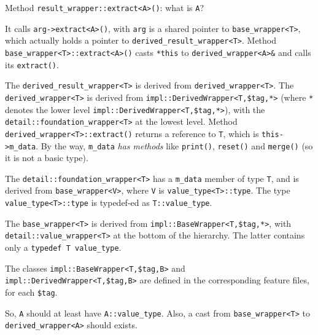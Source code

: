 \documentclass[12pt]{article}
\newcommand{\code}[1]{\texttt{#1}}
\begin{document}
Method \code{result\_wrapper::extract<A>()}: what is \code{A}?

It calls \code{arg->extract<A>()}, with \code{arg} is a shared pointer
to \code{base\_wrapper<T>}, which actually holds a pointer to
\code{derived\_result\_wrapper<T>}. Method
\code{base\_wrapper<T>::extract<A>()} casts \code{*this} to
\code{derived\_wrapper<A>\&} and calls its \code{extract()}.


The
\code{derived\_result\_wrapper<T>} is derived from
\code{derived\_wrapper<T>}. The \code{derived\_wrapper<T>} is derived
from \code{impl::DerivedWrapper<T,\$tag,*>} (where \code{*} denotes
the lower level \code{impl::DerivedWrapper<T,\$tag,*>}), with the
\code{detail::foundation\_wrapper<T>} at the lowest level. Method
\code{derived\_wrapper<T>::extract()} returns a reference to \code{T},
which is \code{this->m\_data}. By the way, \code{m\_data} \emph{has methods}
like \code{print()}, \code{reset()} and \code{merge()} (so it is not a
basic type).

The \code{detail::foundation\_wrapper<T>} has a \code{m\_data} member
of type \code{T}, and is derived from \code{base\_wrapper<V>}, where
\code{V} is \code{value\_type<T>::type}. The type
\code{value\_type<T>::type} is typedef-ed as \code{T::value\_type}.

The \code{base\_wrapper<T>} is derived from
\code{impl::BaseWrapper<T,\$tag,*>}, with
\code{detail::value\_wrapper<T>} at the bottom of the hierarchy. The
latter contains only a \code{typedef T value\_type}.

The classes \code{impl::BaseWrapper<T,\$tag,B>} and
\code{impl::DerivedWrapper<T,\$tag,B>} are defined in the
corresponding feature files, for each \code{\$tag}. 

So, \code{A} should at least have \code{A::value\_type}. Also, a cast
from \code{base\_wrapper<T>} to \code{derived\_wrapper<A>} should exists. 
\end{document}
